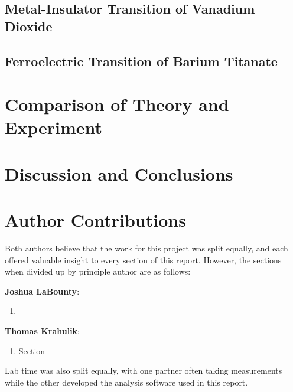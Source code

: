\documentclass[%
 reprint,
 amsmath,amssymb,
 aps,
 pra,
]{revtex4-1}
\begin{document}
\subsection{Metal-Insulator Transition of Vanadium Dioxide}

\subsection{Ferroelectric Transition of Barium Titanate}

\section{Comparison of Theory and Experiment}

\section{Discussion and Conclusions}

\section{Author Contributions}

Both authors believe that the work for this project was split equally, and each offered valuable insight to every section of this report. However, the sections when divided up by principle author are as follows:

\noindent \textbf{Joshua LaBounty}:
\begin{enumerate}
	\item 
\end{enumerate}

\noindent \textbf{Thomas Krahulik}:
\begin{enumerate}
	\item Section 
\end{enumerate}

\noindent Lab time was also split equally, with one partner often taking measurements while the other developed the analysis software used in this report.
\end{document}
